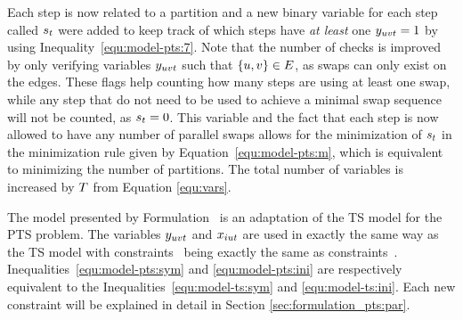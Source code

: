 \documentclass[msc,english,table,xcdraw]{ppgccufmg}
\begin{document}
Each step is now related to a partition and a new binary variable for each step 
called $s_{t}$ were added to keep track of which steps have \textit{at least} 
one $y_{uvt} = 1$ by using Inequality~\ref{equ:model-pts:7}.
Note that the number of checks is improved by only verifying variables $y_{uvt}$
such that $\{u,v\} \in E$, as swaps can only exist on the 
edges.
These flags help counting how many steps are using at least one swap, while any 
step that do not need to be used to achieve a minimal swap sequence will not be 
counted, as $s_{t} = 0$.
This variable and the fact that each step is now allowed to have any number of
parallel swaps allows for the minimization of $s_{t}$ in the minimization 
rule given by Equation~\ref{equ:model-pts:m}, which is equivalent to minimizing 
the number of partitions.
The total number of variables is increased by $T$ from Equation
\ref{equ:vars}.


The model presented by Formulation~ 
is an adaptation of the TS model for the PTS problem. 
The variables $y_{uvt}$ and $x_{iut}$ are used in exactly the same way as the 
TS model with constraints~ being 
exactly the same as constraints~.
Inequalities~\ref{equ:model-pts:sym} and \ref{equ:model-pts:ini} are respectively 
equivalent to the Inequalities~\ref{equ:model-ts:sym} and \ref{equ:model-ts:ini}.
Each new constraint will be explained in detail in Section \ref{sec:formulation_pts:par}.


\end{document}
